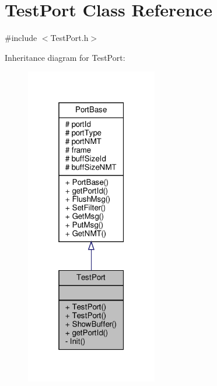 \hypertarget{classTestPort}{}\section{Test\+Port Class Reference}
\label{classTestPort}


{\ttfamily \#include $<$Test\+Port.\+h$>$}



Inheritance diagram for Test\+Port\+:
\nopagebreak
\begin{figure}[H]
\begin{center}
\leavevmode
\includegraphics[width=163pt]{classTestPort__inherit__graph}
\end{center}
\end{figure}


